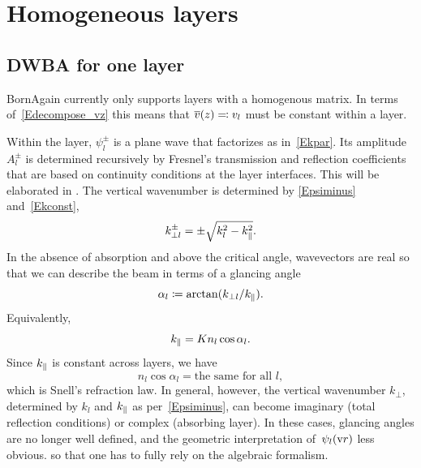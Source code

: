\section{Homogeneous layers}\label{SLayHomo}

\subsection{DWBA for one layer}\label{SStep}

BornAgain currently only supports layers with a homogenous matrix.
In terms of~\cref{Edecompose_vz} this means that
$\overline{v}(z)\eqqcolon v_l$ must be constant within a layer.

Within the layer, $\psi^\pm_l$ is a plane wave
that factorizes as in~\cref{Ekpar}.
Its amplitude~$A_l^\pm$ is determined recursively
by Fresnel's transmission and reflection coefficients
%
that are based on continuity conditions at the layer interfaces.
This will be elaborated in .
%
%
The vertical wavenumber is determined by \cref{Epsiminus} and~\cref{Ekconst},
\begin{equation}\label{Ekperpl}
  k_{\perp l}^\pm = \pm\sqrt{k_l^2 - k_\parallel^2}.
\end{equation}
In the absence of absorption and above the critical angle,
wavevectors are real
so that we can describe the beam in terms of a glancing angle
\begin{equation}\label{Edef_alpha}
  \alpha_l\coloneqq \arctan(k_{\perp l}/k_{\parallel}).
\end{equation}
Equivalently,
\begin{equation}\label{Ekplllncos}
  k_{\parallel}=K n_l \cos\alpha_l.
\end{equation}
Since $k_{\parallel}$ is constant across layers,
we have
\begin{equation}\label{ESnell}
  n_l \cos\alpha_l = \text{the same for all }l,
\end{equation}
which is Snell's refraction law.
In general, however, the vertical wavenumber $k_{\perp}$,
determined by $k_l$ and $k_\parallel$ as per~\cref{Epsiminus},
can become imaginary (total reflection conditions) or complex (absorbing layer).
%
In these cases, glancing angles are no longer well defined,
and the geometric interpretation of~$\psi_l(\text{v}{r})$ less obvious.
so that one has to fully rely on the algebraic formalism.

